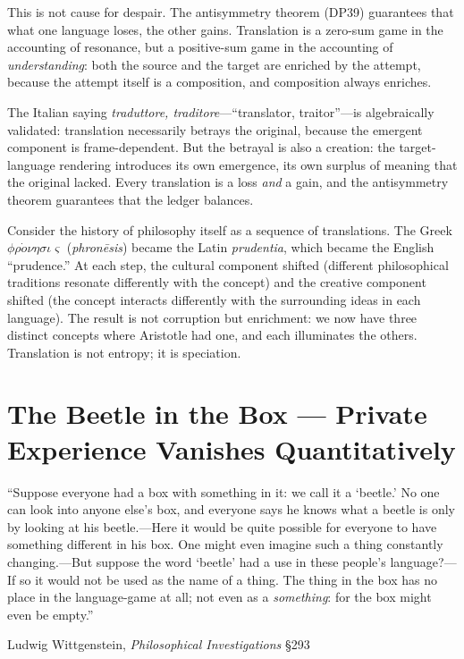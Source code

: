 This is not cause for despair.  The antisymmetry theorem (DP39) guarantees that
what one language loses, the other gains.  Translation is a zero-sum game in
the accounting of resonance, but a positive-sum game in the accounting of
\emph{understanding}: both the source and the target are enriched by the
attempt, because the attempt itself is a composition, and composition always
enriches.

The Italian saying \textit{traduttore, traditore}---``translator, traitor''---is
algebraically validated: translation necessarily betrays the original, because
the emergent component is frame-dependent.  But the betrayal is also a
creation: the target-language rendering introduces its own emergence, its own
surplus of meaning that the original lacked.  Every translation is a loss
\emph{and} a gain, and the antisymmetry theorem guarantees that the ledger
balances.

Consider the history of philosophy itself as a sequence of translations.  The
Greek $\phi\rho\dot{o}\nu\eta\sigma\iota\varsigma$ (\textit{phron\={e}sis})
became the Latin \textit{prudentia}, which became the English ``prudence.''
At each step, the cultural component shifted (different philosophical traditions
resonate differently with the concept) and the creative component shifted (the
concept interacts differently with the surrounding ideas in each language).
The result is not corruption but enrichment: we now have three distinct concepts
where Aristotle had one, and each illuminates the others.  Translation is not
entropy; it is speciation.



\chapter{The Beetle in the Box --- Private Experience Vanishes Quantitatively}
\label{ch:beetle}

\epigraph{``Suppose everyone had a box with something in it: we call it a
`beetle.'  No one can look into anyone else's box, and everyone says he
knows what a beetle is only by looking at his beetle.---Here it would be
quite possible for everyone to have something different in his box.  One might
even imagine such a thing constantly changing.---But suppose the word `beetle'
had a use in these people's language?---If so it would not be used as the name
of a thing.  The thing in the box has no place in the language-game at all;
not even as a \emph{something}: for the box might even be empty.''}{Ludwig
Wittgenstein, \textit{Philosophical Investigations} \S293}

